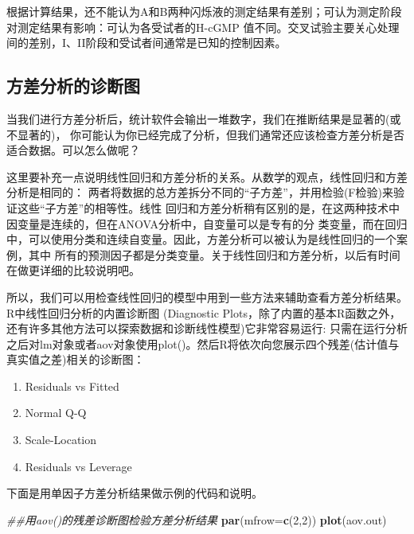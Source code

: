 \documentclass[
]{article}
\newenvironment{Shaded}{\begin{snugshade}}{\end{snugshade}}
\newcommand{\CommentTok}[1]{\textcolor[rgb]{0.56,0.35,0.01}{\textit{#1}}}
\newcommand{\DataTypeTok}[1]{\textcolor[rgb]{0.13,0.29,0.53}{#1}}
\newcommand{\DecValTok}[1]{\textcolor[rgb]{0.00,0.00,0.81}{#1}}
\newcommand{\KeywordTok}[1]{\textcolor[rgb]{0.13,0.29,0.53}{\textbf{#1}}}
\newcommand{\NormalTok}[1]{#1}
\providecommand{\tightlist}{%
  \setlength{\itemsep}{0pt}\setlength{\parskip}{0pt}}
\begin{document}
根据计算结果，还不能认为A和B两种闪烁液的测定结果有差别；可认为测定阶段对测定结果有影响：可认为各受试者的H-cGMP
值不同。交叉试验主要关心处理间的差别，I、II阶段和受试者间通常是已知的控制因素。

\hypertarget{ux65b9ux5deeux5206ux6790ux7684ux8bcaux65adux56fe}{%
\subsection{方差分析的诊断图}\label{ux65b9ux5deeux5206ux6790ux7684ux8bcaux65adux56fe}}

当我们进行方差分析后，统计软件会输出一堆数字，我们在推断结果是显著的(或不显著的)，
你可能认为你已经完成了分析，但我们通常还应该检查方差分析是否适合数据。可以怎么做呢？

这里要补充一点说明线性回归和方差分析的关系。从数学的观点，线性回归和方差分析是相同的：
两者将数据的总方差拆分不同的``子方差''，并用检验(F检验)来验证这些``子方差''的相等性。线性
回归和方差分析稍有区别的是，在这两种技术中因变量是连续的，但在ANOVA分析中，自变量可以是专有的分
类变量，而在回归中，可以使用分类和连续自变量。因此，方差分析可以被认为是线性回归的一个案例，其中
所有的预测因子都是分类变量。关于线性回归和方差分析，以后有时间在做更详细的比较说明吧。

所以，我们可以用检查线性回归的模型中用到一些方法来辅助查看方差分析结果。R中线性回归分析的内置诊断图
(Diagnostic Plots，除了内置的基本R函数之外，还有许多其他方法可以探索数据和诊断线性模型)它非常容易运行:
只需在运行分析之后对lm对象或者aov对象使用plot()。然后R将依次向您展示四个残差(估计值与真实值之差)相关的诊断图：

\begin{enumerate}
\def\labelenumi{\arabic{enumi}.}
\tightlist
\item
  Residuals vs Fitted
\item
  Normal Q-Q
\item
  Scale-Location
\item
  Residuals vs Leverage
\end{enumerate}

下面是用单因子方差分析结果做示例的代码和说明。

\begin{Shaded}
\begin{Highlighting}[]
\CommentTok{##用aov()的残差诊断图检验方差分析结果}
\KeywordTok{par}\NormalTok{(}\DataTypeTok{mfrow=}\KeywordTok{c}\NormalTok{(}\DecValTok{2}\NormalTok{,}\DecValTok{2}\NormalTok{))}
\KeywordTok{plot}\NormalTok{(aov.out)}
\end{Highlighting}
\end{Shaded}
\end{document}
